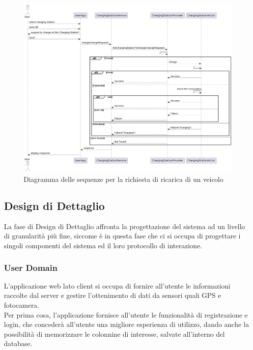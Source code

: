 \begin{figure}[!htbp]
    \centering
    \includegraphics[width=\textwidth]{images/charge.png}
    \caption{Diagramma delle sequenze per la richiesta di ricarica di un veicolo}
    \label{fig:charge}
\end{figure}
\clearpage

\subsection{Design di Dettaglio}
La fase di Design di Dettaglio affronta la progettazione del sistema ad un livello di granularità più fine, siccome è in questa fase che ci si occupa di progettare i singoli componenti del sistema ed il loro protocollo di interazione.\\

\subsubsection{User Domain}

L'applicazione web lato client si occupa di fornire all'utente le informazioni raccolte dal server
e gestire l'ottenimento di dati da sensori quali GPS e fotocamera.\\

Per prima cosa, l'applicazione fornisce all'utente le funzionalità di registrazione e login,
che concederà all'utente una migliore esperienza di utilizzo, dando anche la possibilità di
memorizzare le colonnine di interesse, salvate all'interno del database.\\

